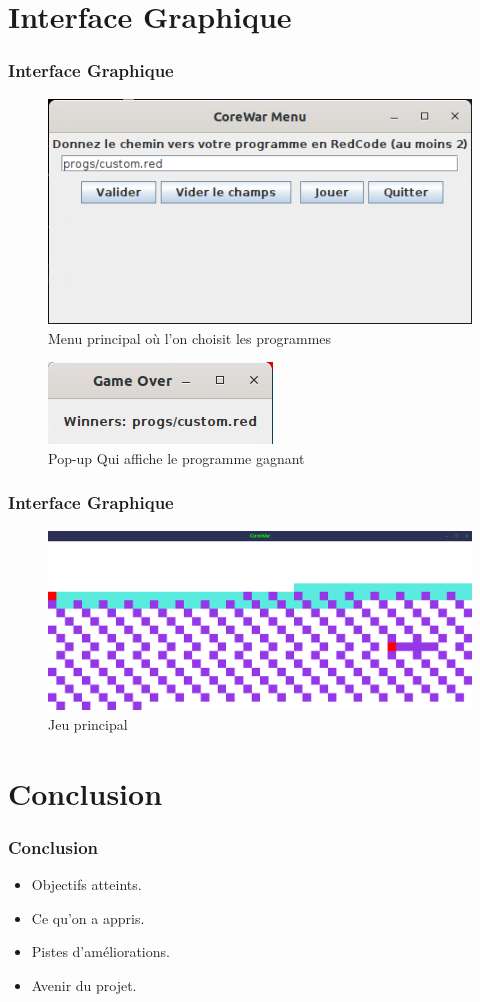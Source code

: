 \documentclass{beamer}
\begin{document}
\section{Interface Graphique}
\begin{frame}
\frametitle{Interface Graphique}
\begin{figure}
	\includegraphics[height=0.4\textheight]{images/mainMenu.png}
	\caption{Menu principal où l'on choisit les programmes}
\end{figure}
\begin{figure}
	\includegraphics[height=0.2\textheight]{images/gameOver.png}
	\caption{Pop-up Qui affiche le programme gagnant}
\end{figure}
\end{frame}
		
\begin{frame}
\frametitle{Interface Graphique}
\begin{figure}
	\includegraphics[height=0.4\textheight]{images/jeu.png}
	\caption{Jeu principal}
\end{figure}
\end{frame}

\section{Conclusion}
\begin{frame}
\frametitle{Conclusion}
\begin{itemize}
	\item Objectifs atteints.
	\item Ce qu'on a appris.
	\item Pistes d'améliorations.
	\item Avenir du projet.
	
\end{itemize}
\end{frame}
\end{document}
